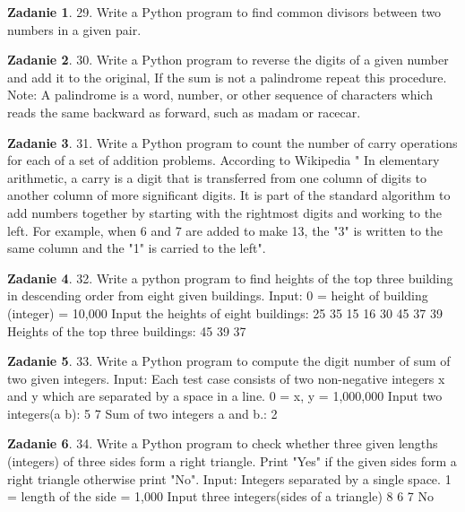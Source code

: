\documentclass[11pt]{article}
\theoremstyle{definition}
\newtheorem{zadanie}{Zadanie}
\begin{document}
\begin{zadanie}
29. Write a Python program to find common divisors between two numbers in a given pair.
\end{zadanie}

\begin{zadanie}
30. Write a Python program to reverse the digits of a given number and add it to the original, If the sum is not a palindrome repeat this procedure.
Note: A palindrome is a word, number, or other sequence of characters which reads the same backward as forward, such as madam or racecar.
\end{zadanie}

\begin{zadanie}
31. Write a Python program to count the number of carry operations for each of a set of addition problems.
According to Wikipedia " In elementary arithmetic, a carry is a digit that is transferred from one column of digits to another column of more significant digits. It is part of the standard algorithm to add numbers together by starting with the rightmost digits and working to the left. For example, when 6 and 7 are added to make 13, the "3" is written to the same column and the "1" is carried to the left".
\end{zadanie}

\begin{zadanie}
32. Write a python program to find heights of the top three building in descending order from eight given buildings.
Input:
0 = height of building (integer) = 10,000
Input the heights of eight buildings:
25
35
15
16
30
45
37
39
Heights of the top three buildings:
45
39
37
\end{zadanie}

\begin{zadanie}
33. Write a Python program to compute the digit number of sum of two given integers.
Input:
Each test case consists of two non-negative integers x and y which are separated by a space in a line.
0 = x, y = 1,000,000
Input two integers(a b):
5 7
Sum of two integers a and b.:
2
\end{zadanie}

\begin{zadanie}
34. Write a Python program to check whether three given lengths (integers) of three sides form a right triangle. Print "Yes" if the given sides form a right triangle otherwise print "No".
Input:
Integers separated by a single space.
1 = length of the side = 1,000
Input three integers(sides of a triangle)
8 6 7
No
\end{zadanie}
\end{document}
